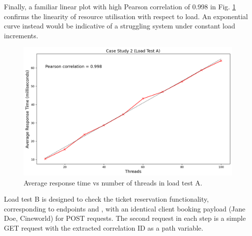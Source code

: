 Finally, a familiar linear plot with high Pearson correlation of 0.998 in Fig. \ref{fig:cs02-lta-4} confirms the linearity of resource utilisation with respect to load. An exponential curve instead would be indicative of a struggling system under constant load increments.

\begin{figure}[H]
  \centering
  \includegraphics[width=0.8\linewidth]{./assets/images/case-study-02/cs02-lta-4.png}
  \caption{Average response time vs number of threads in load test A.}
  \label{fig:cs02-lta-4}
\end{figure}

Load test B is designed to check the ticket reservation functionality, corresponding to endpoints  and , with an identical client booking payload (Jane Doe, Cineworld) for POST requests. The second request in each step is a simple GET request with the extracted correlation ID as a path variable.

